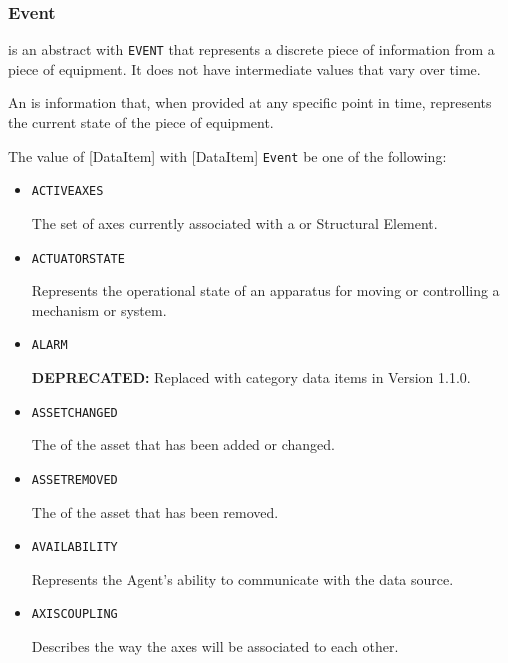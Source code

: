 \subsubsection{Event}
\label{sec:Event}



 is an abstract  with \texttt{EVENT}  that represents a discrete piece of information from a piece of equipment. It does not have intermediate values that vary over time.

An  is information that, when provided at any specific point in time, represents the current state of the piece of equipment.


The value of [DataItem] with [DataItem] \texttt{Event} \MUST be one of the following:
\begin{itemize}


\item \texttt{ACTIVE\textunderscore AXES}  

The set of axes currently associated with a  or  \gls{Structural Element}.


\item \texttt{ACTUATOR\textunderscore STATE}  

Represents the operational state of an apparatus for moving or controlling a mechanism or system.


\item \texttt{ALARM}  

\textbf{DEPRECATED:} Replaced with  category data items in Version 1.1.0.


\item \texttt{ASSET\textunderscore CHANGED}  

The  of the asset that has been added or changed.


\item \texttt{ASSET\textunderscore REMOVED}  

The  of the asset that has been removed.


\item \texttt{AVAILABILITY}  

Represents the \gls{Agent}'s ability to communicate with the data source.


\item \texttt{AXIS\textunderscore COUPLING}  

Describes the way the axes will be associated to each other. 
  

\end{itemize}
